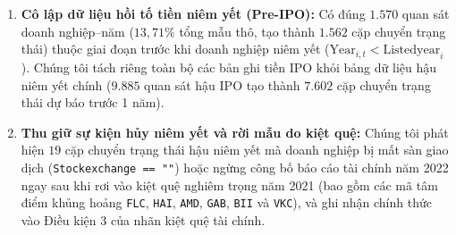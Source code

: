 \documentclass[11pt,a4paper]{article}
\begin{document}
\begin{enumerate}
\begin{equation}
    \end{equation}
    và xác định chi phí lãi vay sạch $I_{i,t} = |\text{interestexp}_{i,t}|$ khi có dữ liệu, hoặc $\kappa_{\text{train}} F_{i,t}$ khi bị khuyết. Đặc biệt quan trọng, chúng tôi chứng minh rằng nếu định nghĩa ngây thơ $\text{EBIT}_{\text{naive}} = \text{NetProfit}_{i,t} + I_{i,t}$ thì bất đẳng thức $\text{ICR}_{\text{naive}} = \text{EBIT}_{\text{naive}} / I_{i,t} < 1,0$ sẽ tương đương đại số tuyệt đối với $\text{NetProfit}_{i,t} < 0$. Chúng tôi triệt tiêu đồng nhất thức giả tạo này bằng cách tái cấu trúc \textbf{EBIT hoạt động cốt lõi ($\text{EBIT}_{\text{op}}$)} từ doanh thu thuần và chi phí hoạt động:
    \begin{equation}
        \text{EBIT}_{\text{op}, i, t} = \text{NetSales}_{i,t} - C_{i,t} - S_{i,t} - A_{i,t}, \qquad \text{ICR}_{\text{op}, i, t} = \frac{\text{EBIT}_{\text{op}, i, t}}{I_{i,t} + \epsilon},
    \end{equation}
    trong đó $\epsilon = 1,0$ VND giúp tránh phép chia cho $0$ đối với các doanh nghiệp không vay nợ.
    \item \textbf{Cô lập dữ liệu hồi tố tiền niêm yết (Pre-IPO):} Có đúng $1.570$ quan sát doanh nghiệp--năm ($13,71\%$ tổng mẫu thô, tạo thành $1.562$ cặp chuyển trạng thái) thuộc giai đoạn trước khi doanh nghiệp niêm yết ($\text{Year}_{i,t} < \text{Listedyear}_i$). Chúng tôi tách riêng toàn bộ các bản ghi tiền IPO khỏi bảng dữ liệu hậu niêm yết chính ($9.885$ quan sát hậu IPO tạo thành $7.602$ cặp chuyển trạng thái dự báo trước 1 năm).
    \item \textbf{Thu giữ sự kiện hủy niêm yết và rời mẫu do kiệt quệ:} Chúng tôi phát hiện $19$ cặp chuyển trạng thái hậu niêm yết mà doanh nghiệp bị mất sàn giao dịch (\texttt{Stockexchange == ""}) hoặc ngừng công bố báo cáo tài chính năm 2022 ngay sau khi rơi vào kiệt quệ nghiêm trọng năm 2021 (bao gồm các mã tâm điểm khủng hoảng \texttt{FLC}, \texttt{HAI}, \texttt{AMD}, \texttt{GAB}, \texttt{BII} và \texttt{VKC}), và ghi nhận chính thức vào Điều kiện 3 của nhãn kiệt quệ tài chính.
\end{enumerate}
\end{document}
